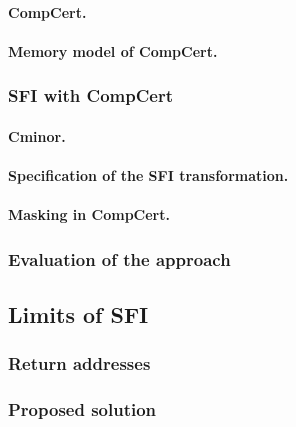 \documentclass[11pt]{sdm}
\begin{document}
\paragraph{CompCert.}
\label{par:CompCert}
\paragraph{Memory model of CompCert.}
\label{par:Memory model of CompCert}


\subsubsection{SFI with CompCert}
\label{ssub:SFI with CompCert}
\paragraph{Cminor.}
\label{par:Cminor}
\paragraph{Specification of the SFI transformation.}
\label{par:Specification of the SFI tranformation}
\paragraph{Masking in CompCert.}
\label{par:Masking in CompCert}




\subsubsection{Evaluation of the approach}
\label{ssub:Evalutation of the approach}

\subsection{Limits of SFI}
\label{sub:Limits of SFI}
\subsubsection{Return addresses}
\label{ssub:Return addresses}
\subsubsection{Proposed solution}


\newpage
\end{document}
